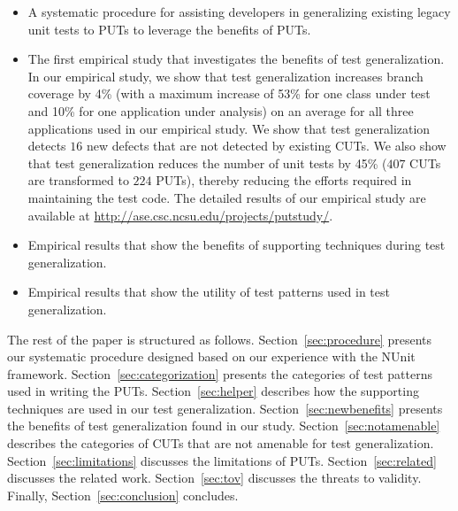 \begin{itemize}
	\item A systematic procedure for assisting developers in generalizing existing legacy unit tests to PUTs to leverage the benefits of PUTs.
	\item The first empirical study that investigates the benefits of test generalization. In our empirical study, we show that test generalization increases branch coverage by 4\% (with a maximum increase of 53\% for one class under test and 10\% for one application under analysis) on an average for all three applications used in our empirical study. We show that test generalization detects $16$ new defects that are not detected by existing CUTs. We also show that test generalization reduces the number of unit tests by 45\% ($407$ CUTs are transformed to $224$ PUTs), thereby reducing the efforts required in maintaining the test code. The detailed results of our empirical study are available at \url{http://ase.csc.ncsu.edu/projects/putstudy/}.	
	\item Empirical results that show the benefits of supporting techniques during test generalization. 
	\item Empirical results that show the utility of test patterns used in test generalization.
\end{itemize}

The rest of the paper is structured as follows. 
Section~\ref{sec:procedure} presents our systematic procedure designed based on our experience with the NUnit framework.
Section~\ref{sec:categorization} presents the categories of test patterns used in writing the PUTs. 
Section~\ref{sec:helper} describes how the supporting techniques are used in our test generalization. 
Section~\ref{sec:newbenefits} presents the benefits of test generalization found in our study. 
Section~\ref{sec:notamenable} describes the categories of CUTs that are not amenable for test generalization.
Section~\ref{sec:limitations} discusses the limitations of PUTs. Section~\ref{sec:related} discusses the related work. Section~\ref{sec:tov} discusses the threats to validity. Finally, Section~\ref{sec:conclusion} concludes.



